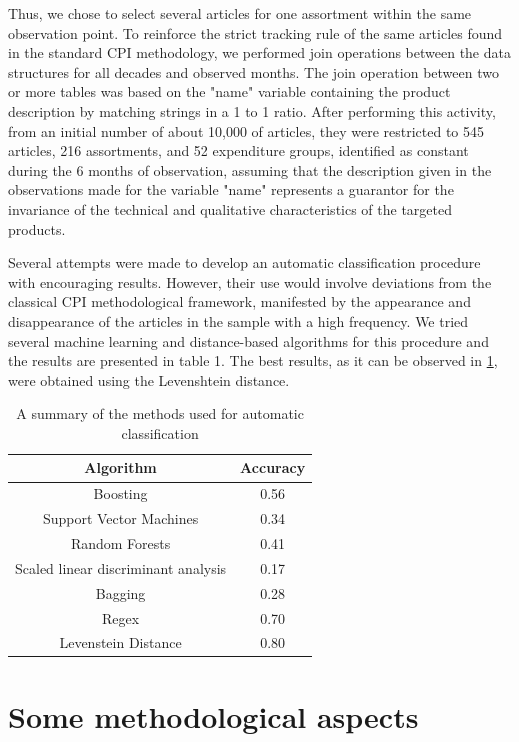 \documentclass[]{article}
\begin{document}
Thus, we chose to select several articles for one assortment within the same observation point. To reinforce the strict tracking 
rule of the same articles found in the standard CPI methodology, we performed join operations between the data structures 
for all decades and observed months. The join operation between two or more tables was based on the "name" variable containing 
the product description by matching strings in a 1 to 1 ratio. After performing this activity, from an initial number 
of about 10,000 of articles, they were restricted to 545 articles, 216 assortments, and 52 expenditure groups, 
identified as constant during the 6 months of observation, assuming that the description given in the observations 
made for the variable "name" represents a guarantor for the invariance of the technical and qualitative characteristics of the targeted products.


Several attempts were made to develop an automatic classification procedure with encouraging results. However, their use 
would involve deviations from the classical CPI methodological framework, manifested by the appearance and disappearance 
of the articles in the sample with a high frequency. We tried several machine learning and distance-based algorithms 
for this procedure and the results are presented in table 1. The best results, as it can be observed in \ref{table:2}, 
were obtained using the Levenshtein distance.


\begin{table}[h!]
\centering
\begin{tabular}{ c c }
	\hline
	Algorithm & Accuracy \\
	\hline  
	Boosting & 0.56 \\  
	Support Vector Machines & 0.34 \\
	Random Forests &  0.41 \\
	Scaled linear discriminant analysis & 0.17 \\
	Bagging & 0.28 \\
	Regex & 0.70 \\
	Levenstein Distance & 0.80 \\
	\hline
\end{tabular}
\caption{A summary of the methods used for automatic classification}
\label{table:2}
\end{table}

\section{Some methodological aspects}\label{methodology}
\end{document}
